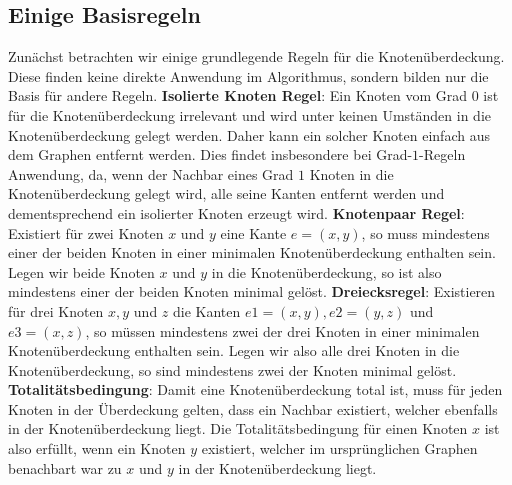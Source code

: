 \documentclass[12pt,onecolumn, notitlepage]{scrartcl}
\begin{document}
\subsection{Einige Basisregeln}
Zunächst betrachten wir einige grundlegende Regeln für die Knotenüberdeckung. Diese finden keine direkte Anwendung im Algorithmus, sondern bilden nur die Basis für andere Regeln. \newline \newline
\textbf{Isolierte Knoten Regel}: Ein Knoten vom Grad $0$ ist für die Knotenüberdeckung irrelevant und wird unter keinen Umständen in die Knotenüberdeckung gelegt werden. Daher kann ein solcher Knoten einfach aus dem Graphen entfernt werden. \newline
Dies findet insbesondere bei Grad-$1$-Regeln Anwendung, da, wenn der Nachbar eines Grad $1$ Knoten in die Knotenüberdeckung gelegt wird, alle seine Kanten entfernt werden und dementsprechend ein isolierter Knoten erzeugt wird. \newline \newline
\textbf{Knotenpaar Regel}: Existiert für zwei Knoten $x$ und $y$ eine Kante $e = (x,y)$, so muss mindestens einer der beiden Knoten in einer minimalen Knotenüberdeckung enthalten sein. Legen wir beide Knoten $x$ und $y$ in die Knotenüberdeckung, so ist also mindestens einer der beiden Knoten minimal gelöst. \newline \newline
\textbf{Dreiecksregel}: Existieren für drei Knoten $x, y$ und $z$ die Kanten $e1 = (x,y), e2 = (y,z)$ und $ e3 = (x,z)$, so müssen mindestens zwei der drei Knoten in einer minimalen Knotenüberdeckung enthalten sein. Legen wir also alle drei Knoten in die Knotenüberdeckung, so sind mindestens zwei der Knoten minimal gelöst. \newline \newline
\textbf{Totalitätsbedingung}: Damit eine Knotenüberdeckung total ist, muss für jeden Knoten in der Überdeckung gelten, dass ein Nachbar existiert, welcher ebenfalls in der Knotenüberdeckung liegt. Die Totalitätsbedingung für einen Knoten $x$ ist also erfüllt, wenn ein Knoten $y$ existiert, welcher im ursprünglichen Graphen benachbart war zu $x$ und $y$ in der Knotenüberdeckung liegt. \newline
\end{document}
